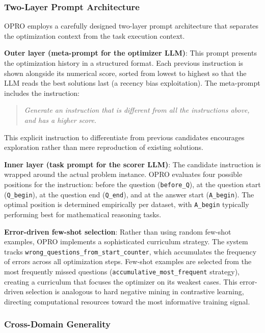 \subsubsection{Two-Layer Prompt Architecture}

OPRO employs a carefully designed two-layer prompt architecture that separates the optimization context from the task execution context.

\textbf{Outer layer (meta-prompt for the optimizer LLM)}: This prompt presents the optimization history in a structured format. Each previous instruction is shown alongside its numerical score, sorted from lowest to highest so that the LLM reads the best solutions last (a recency bias exploitation). The meta-prompt includes the instruction:
\begin{quote}
\textit{Generate an instruction that is different from all the instructions above, and has a higher score.}
\end{quote}
This explicit instruction to differentiate from previous candidates encourages exploration rather than mere reproduction of existing solutions.

\textbf{Inner layer (task prompt for the scorer LLM)}: The candidate instruction is wrapped around the actual problem instance. OPRO evaluates four possible positions for the instruction: before the question (\texttt{before\_Q}), at the question start (\texttt{Q\_begin}), at the question end (\texttt{Q\_end}), and at the answer start (\texttt{A\_begin}). The optimal position is determined empirically per dataset, with \texttt{A\_begin} typically performing best for mathematical reasoning tasks.

\textbf{Error-driven few-shot selection}: Rather than using random few-shot examples, OPRO implements a sophisticated curriculum strategy. The system tracks \texttt{wrong\_questions\_from\_start\_counter}, which accumulates the frequency of errors across all optimization steps. Few-shot examples are selected from the most frequently missed questions (\texttt{accumulative\_most\_frequent} strategy), creating a curriculum that focuses the optimizer on its weakest cases. This error-driven selection is analogous to hard negative mining in contrastive learning, directing computational resources toward the most informative training signal.

\subsubsection{Cross-Domain Generality}

